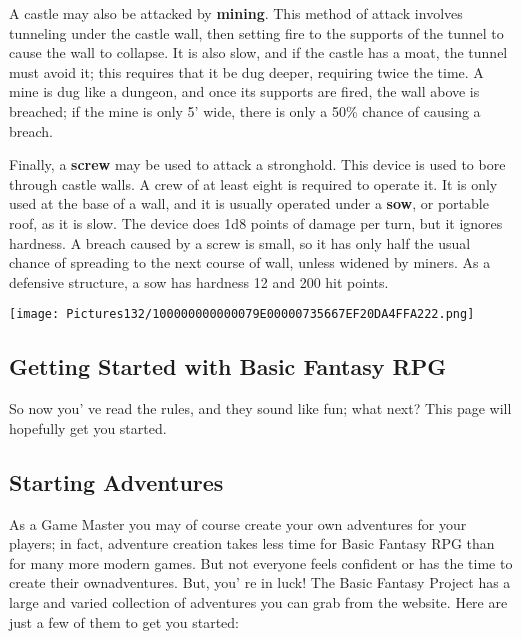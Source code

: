 \documentclass[a4paper,twoside,openany,10pt]{book}
\begin{document}
\begin{multicols}{2}
A castle may also be attacked by \textbf{mining}. This method of attack involves tunneling under the castle wall, then setting fire to the supports of the tunnel to cause the wall to collapse. It is also slow, and if the castle has a moat, the tunnel must avoid it; this requires that it be dug deeper, requiring twice the time. A mine is dug like a dungeon, and once its supports are fired, the wall above is breached; if the mine is only 5' wide, there is only a 50\% chance of causing a breach.

Finally, a \textbf{screw} may be used to attack a stronghold. This device is used to bore through castle walls. A crew of at least eight is required to operate it. It is only used at the base of a wall, and it is usually operated under a \textbf{sow}, or portable roof, as it is slow. The device does 1d8 points of damage per turn, but it ignores hardness. A breach caused by a screw is small, so it has only half the usual chance of spreading to the next course of wall, unless widened by miners. As a defensive structure, a sow has hardness 12 and 200 hit points. 
\end{multicols}

\pagebreak

\begin{center}
	\texttt{[image: Pictures132/100000000000079E00000735667EF20DA4FFA222.png]} 
\end{center}

\pagebreak

\subsection{Getting Started with Basic Fantasy RPG}\label{getting-started-with-basic-fantasy-rpg}

So now you' ve read the rules, and they sound like fun;
what next? This page will hopefully get you started.

\subsection{Starting Adventures}\label{starting-adventures}

As a Game Master you may of course create your own adventures for your players; in fact, adventure creation takes less time for Basic Fantasy RPG than for many more modern games. But not everyone feels confident or has the time to create their ownadventures. But, you' re  in luck! The Basic Fantasy Project has a large and varied collection of adventures you can grab from the website. Here are just a few of them to get you started:
\end{document}
